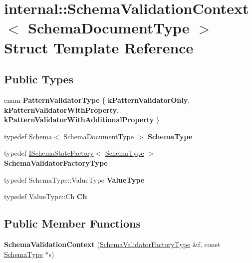 \hypertarget{a00263}{}\section{internal\+:\+:Schema\+Validation\+Context$<$ Schema\+Document\+Type $>$ Struct Template Reference}
\label{a00263}
\subsection*{Public Types}
\begin{DoxyCompactItemize}
\item 
enum {\bfseries Pattern\+Validator\+Type} \{ {\bfseries k\+Pattern\+Validator\+Only}, 
{\bfseries k\+Pattern\+Validator\+With\+Property}, 
{\bfseries k\+Pattern\+Validator\+With\+Additional\+Property}
 \}\hypertarget{a00263_a4fb1b8fe7ecb9d4608e6b0ac0716826c}{}\label{a00263_a4fb1b8fe7ecb9d4608e6b0ac0716826c}

\item 
typedef \hyperlink{a00261}{Schema}$<$ Schema\+Document\+Type $>$ {\bfseries Schema\+Type}\hypertarget{a00263_a79b155ab3711b97b6e33ced450614397}{}\label{a00263_a79b155ab3711b97b6e33ced450614397}

\item 
typedef \hyperlink{a00182}{I\+Schema\+State\+Factory}$<$ \hyperlink{a00261}{Schema\+Type} $>$ {\bfseries Schema\+Validator\+Factory\+Type}\hypertarget{a00263_a33fa91fd8e880d1adb9b891fe441f110}{}\label{a00263_a33fa91fd8e880d1adb9b891fe441f110}

\item 
typedef Schema\+Type\+::\+Value\+Type {\bfseries Value\+Type}\hypertarget{a00263_acc134e808d3a4dbe8834eb1a3e98e816}{}\label{a00263_acc134e808d3a4dbe8834eb1a3e98e816}

\item 
typedef Value\+Type\+::\+Ch {\bfseries Ch}\hypertarget{a00263_abd905cd1513b117f1db68b58d6c41daf}{}\label{a00263_abd905cd1513b117f1db68b58d6c41daf}

\end{DoxyCompactItemize}
\subsection*{Public Member Functions}
\begin{DoxyCompactItemize}
\item 
{\bfseries Schema\+Validation\+Context} (\hyperlink{a00182}{Schema\+Validator\+Factory\+Type} \&f, const \hyperlink{a00261}{Schema\+Type} $\ast$s)\hypertarget{a00263_a4adc8f66779626c9da4a56e7a87dcfac}{}\label{a00263_a4adc8f66779626c9da4a56e7a87dcfac}

\end{DoxyCompactItemize}
